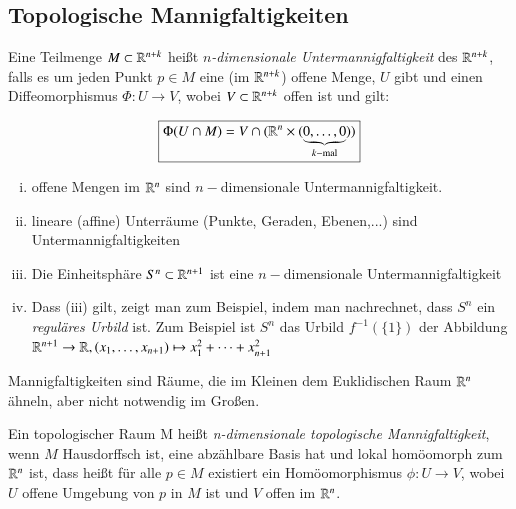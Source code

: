 \documentclass[a4paper,10pt]{scrartcl}
\begin{document}
\subsection{Topologische Mannigfaltigkeiten}
\begin{df}
Eine Teilmenge $M\subset \mathbb{R}^{n+k}$ heißt \emph{$n$-dimensionale Untermannigfaltigkeit} des $\mathbb{R}^{n+k}$, falls es um jeden Punkt $p\in M$ eine (im $\mathbb{R}^{n+k}$) offene Menge, $U$ gibt und einen Diffeomorphismus $\Phi: U\to V$, wobei $V\subset \mathbb{R}^{n+k}$ offen ist und gilt:
\begin{figure}[H]
\centering
 \fixme[fig30]
\caption{}
\end{figure}
\[
 \boxed{\Phi(U\cap M)=V\cap(\mathbb{R}^n\times(\underbrace{0,\dotsc  ,0}_{k-\text{mal}}))}
\]
\end{df}
\begin{exs*}
 \begin{enumerate}[(i)]
  \item offene Mengen im $\mathbb{R}^n$ sind $n-$dimensionale Untermannigfaltigkeit.
  \item lineare (affine) Unterräume (Punkte, Geraden, Ebenen,...) sind Untermannigfaltigkeiten
  \item Die Einheitsphäre $S^n\subset \mathbb{R}^{n+1}$ ist eine $n-$dimensionale Untermannigfaltigkeit
  \item Dass (iii) gilt, zeigt man zum Beispiel, indem man nachrechnet, dass $S^n$ ein \emph{reguläres Urbild} ist. Zum Beispiel ist $S^n$ das Urbild $f^{-1}(\{1\})$ der Abbildung $\mathbb{R}^{n+1}\to \mathbb{R}, (x_1,\dotsc  ,x_{n+1})\mapsto x_1^2+\dotsb +x_{n+1}^2$
 \end{enumerate}
Mannigfaltigkeiten sind Räume, die im Kleinen dem Euklidischen Raum $\mathbb{R}^n$ ähneln, aber nicht notwendig im Großen.
\end{exs*}
\begin{df}
 Ein topologischer Raum M heißt \emph{n-dimensionale topologische Mannigfaltigkeit}, wenn $M$ Hausdorffsch ist, eine abzählbare Basis hat und lokal homöomorph zum $\mathbb{R}^n$ ist, dass heißt für alle $p\in M$ existiert ein Homöomorphismus $\phi:U\to V$, wobei $U$ offene Umgebung von $p$ in $M$ ist und $V$ offen im $\mathbb{R}^n$.
\end{df}
\begin{figure}[H]
\centering
 \fixme[fig31]
\caption{}
\end{figure}
\end{document}
